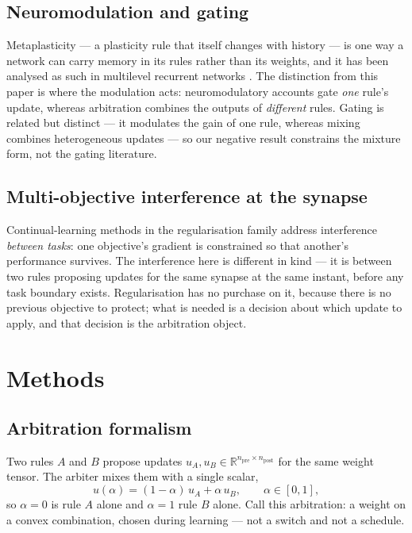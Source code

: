 \documentclass[11pt]{article}
\begin{document}
\subsection{Neuromodulation and gating}

Metaplasticity --- a plasticity rule that itself changes with history --- is one way a network can
carry memory in its rules rather than its weights, and it has been analysed as such in multilevel
recurrent networks \citep{zanardi2024metaplasticity}. The distinction from this paper is where the
modulation acts: neuromodulatory accounts gate \emph{one} rule's update, whereas arbitration
combines the outputs of \emph{different} rules. Gating is related but distinct --- it modulates the
gain of one rule, whereas mixing combines heterogeneous updates --- so our negative result
constrains the mixture form, not the gating literature.

\subsection{Multi-objective interference at the synapse}

Continual-learning methods in the regularisation family address interference \emph{between tasks}:
one objective's gradient is constrained so that another's performance survives. The interference
here is different in kind --- it is between two rules proposing updates for the same synapse at the
same instant, before any task boundary exists. Regularisation has no purchase on it, because there
is no previous objective to protect; what is needed is a decision about which update to apply, and
that decision is the arbitration object.

\section{Methods}

\subsection{Arbitration formalism}

Two rules $A$ and $B$ propose updates $u_A, u_B \in \mathbb{R}^{n_{\text{pre}} \times n_{\text{post}}}$
for the same weight tensor. The arbiter mixes them with a single scalar,
\begin{equation}
u(\alpha) = (1 - \alpha)\, u_A + \alpha\, u_B, \qquad \alpha \in [0, 1],
\end{equation}
so $\alpha = 0$ is rule $A$ alone and $\alpha = 1$ rule $B$ alone. Call this arbitration: a
weight on a convex combination, chosen during learning --- not a switch and not a schedule.
\end{document}
